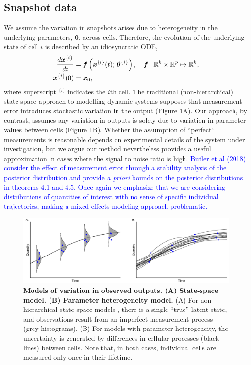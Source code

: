 \subsection{Snapshot data}
We assume the variation in snapshots arises due to heterogeneity in the underlying parameters, $\boldsymbol{\theta}$, across cells. Therefore, the evolution of the underlying state of cell $i$ is described by an idiosyncratic ODE,
%
\begin{equation} \label{eq:ode_i}
\begin{aligned}
\frac{d\boldsymbol{x}^{\{i\}}}{dt} &= \boldsymbol{f} \left( \boldsymbol{x}^{\{i\}}(t); \, \boldsymbol{\theta}^{\{i\}} \right),
                                      \quad \boldsymbol{f}: \mathbb{R}^k \times \mathbb{R}^p \mapsto \mathbb{R}^k, \\
\boldsymbol{x}^{\{i\}}(0) &= \boldsymbol{x}_0,
\end{aligned}
\end{equation}
where superscript $^{\{i\}}$ indicates the $i$th cell.
%
The traditional (non-hierarchical) state-space approach to modelling dynamic systems supposes that measurement error introduces stochastic variation in the output (Figure \ref{fig:data_generation}A). Our approach, by contrast, assumes any variation in outputs is solely due to variation in parameter values between cells (Figure \ref{fig:data_generation}B). Whether the assumption of ``perfect'' measurements is reasonable depends on experimental details of the system under investigation, but we argue our method nevertheless provides a useful approximation in cases where the signal to noise ratio is high. \textcolor{blue}{Butler et al (2018) \cite{BJW-18} consider the effect of measurement error through a stability analysis of the posterior distribution and provide \emph{a priori} bounds on the posterior distributions in theorems 4.1 and 4.5.} \textcolor{blue}{Once again we emphasize that we are considering distributions of quantities of interest with no sense of specific individual trajectories, making a mixed effects modeling approach problematic.}

\begin{figure}[H]
  \centerline{\includegraphics[width=\textwidth]{../figures/data_generation.pdf}}
  \caption{\textbf{Models of variation in observed outputs. (A) State-space model. (B) Parameter heterogeneity model.} (A) For non-hierarchical state-space models , there is a single ``true'' latent state, and observations result from an imperfect measurement process (grey histograms). (B) For models with parameter heterogeneity, the uncertainty is generated by differences in cellular processes (black lines) between cells. Note that, in both cases, individual cells are measured only once in their lifetime.}
  \label{fig:data_generation}
\end{figure}

